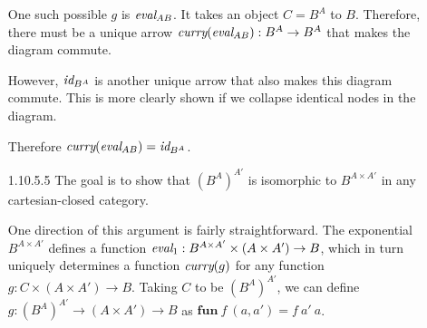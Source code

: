 \documentclass{article}
\begin{document}
\begin{enumerate}
\begin{center}
  \end{center}

  One such possible $g$ is $\emph{eval}_{AB}$.
  It takes an object $C = B^A$ to $B$.
  Therefore, there must be a unique arrow $\emph{curry}(\emph{eval}_{AB}) : B^A \rightarrow B^A$ that makes the diagram commute.
  \begin{center}
  \end{center}
  
  However, $\emph{id}_{B^A}$ is another unique arrow that also makes this diagram commute.
  This is more clearly shown if we collapse identical nodes in the diagram.
  \begin{center}
  \end{center}

  Therefore $\emph{curry}(\emph{eval}_{AB}) = \emph{id}_{B^A}$.

\newpage
\item [1.10.5.5]
  The goal is to show that $(B^A)^{A'}$ is isomorphic to $B^{A \times A'}$ in any cartesian-closed category.

  One direction of this argument is fairly straightforward.
  The exponential $B^{A \times A'}$ defines a function $\emph{eval}_1 : B^{A \times A'} \times (A \times A') \rightarrow B$, which in turn uniquely determines a function $\emph{curry}(g)$ for any function $g : C \times (A \times A') \rightarrow B$.
  Taking $C$ to be $(B^A)^{A'}$, we can define $g : (B^A)^{A'} \rightarrow (A \times A') \rightarrow B$ as $\mathbf{fun}~f~(a,a') = f~a'~a$.
  \begin{center}
\end{center}
\end{enumerate}
\end{document}
